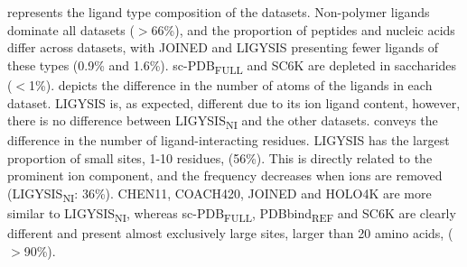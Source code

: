  represents the ligand type composition of the datasets. Non-polymer ligands dominate all datasets ($>$66\%), and the proportion of peptides and nucleic acids differ across datasets, with JOINED and LIGYSIS presenting fewer ligands of these types (0.9\% and 1.6\%). sc-PDB\textsubscript{FULL} and SC6K are depleted in saccharides ($<$1\%).  depicts the difference in the number of atoms of the ligands in each dataset. LIGYSIS is, as expected, different due to its ion ligand content, however, there is no difference between LIGYSIS\textsubscript{NI} and the other datasets.  conveys the difference in the number of ligand-interacting residues. LIGYSIS has the largest proportion of small sites, 1-10 residues, (56\%). This is directly related to the prominent ion component, and the frequency decreases when ions are removed (LIGYSIS\textsubscript{NI}: 36\%). CHEN11, COACH420, JOINED and HOLO4K are more similar to LIGYSIS\textsubscript{NI}, whereas sc-PDB\textsubscript{FULL}, PDBbind\textsubscript{REF} and SC6K are clearly different and present almost exclusively large sites, larger than 20 amino acids, ($>$90\%).

